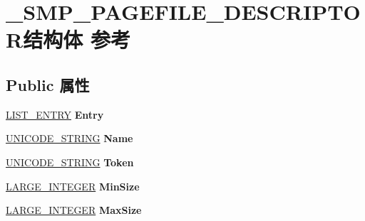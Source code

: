 \hypertarget{struct___s_m_p___p_a_g_e_f_i_l_e___d_e_s_c_r_i_p_t_o_r}{}\section{\+\_\+\+S\+M\+P\+\_\+\+P\+A\+G\+E\+F\+I\+L\+E\+\_\+\+D\+E\+S\+C\+R\+I\+P\+T\+O\+R结构体 参考}
\label{struct___s_m_p___p_a_g_e_f_i_l_e___d_e_s_c_r_i_p_t_o_r}
\subsection*{Public 属性}
\begin{DoxyCompactItemize}
\item 
\mbox{\label{struct___s_m_p___p_a_g_e_f_i_l_e___d_e_s_c_r_i_p_t_o_r_ae6876e8a7855ec8fed3688cc45c4dfa7}} 
\hyperlink{struct___l_i_s_t___e_n_t_r_y}{L\+I\+S\+T\+\_\+\+E\+N\+T\+RY} {\bfseries Entry}
\item 
\mbox{\label{struct___s_m_p___p_a_g_e_f_i_l_e___d_e_s_c_r_i_p_t_o_r_a3fb01748ff0d6e1714a5fce9bedc946d}} 
\hyperlink{struct___u_n_i_c_o_d_e___s_t_r_i_n_g}{U\+N\+I\+C\+O\+D\+E\+\_\+\+S\+T\+R\+I\+NG} {\bfseries Name}
\item 
\mbox{\label{struct___s_m_p___p_a_g_e_f_i_l_e___d_e_s_c_r_i_p_t_o_r_a49f5be8ea3f8466a75a0de4027809001}} 
\hyperlink{struct___u_n_i_c_o_d_e___s_t_r_i_n_g}{U\+N\+I\+C\+O\+D\+E\+\_\+\+S\+T\+R\+I\+NG} {\bfseries Token}
\item 
\mbox{\label{struct___s_m_p___p_a_g_e_f_i_l_e___d_e_s_c_r_i_p_t_o_r_a7912522e9c3d5d802a5b449f52086a79}} 
\hyperlink{union___l_a_r_g_e___i_n_t_e_g_e_r}{L\+A\+R\+G\+E\+\_\+\+I\+N\+T\+E\+G\+ER} {\bfseries Min\+Size}
\item 
\mbox{\label{struct___s_m_p___p_a_g_e_f_i_l_e___d_e_s_c_r_i_p_t_o_r_afd16c32d2446b5d8b30e1d90aaa182d9}} 
\hyperlink{union___l_a_r_g_e___i_n_t_e_g_e_r}{L\+A\+R\+G\+E\+\_\+\+I\+N\+T\+E\+G\+ER} {\bfseries Max\+Size}

\end{DoxyCompactItemize}
